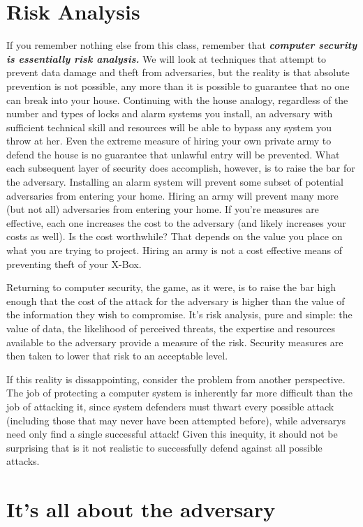\documentclass[11pt]{article}
\begin{document}
\section{Risk Analysis}
If you remember nothing else from this class, remember that \textit{\textbf{computer security is essentially
risk analysis.}}  We will look at techniques that attempt to prevent data damage and theft from adversaries, 
but the reality is that absolute prevention is not possible, any more than it is possible to guarantee that
no one can break into your house.  Continuing with the house analogy, regardless of the number and types of locks and alarm systems you install, 
an adversary with sufficient technical skill and resources will be able to bypass any system you throw at her.
Even the extreme measure of hiring your
own private army to defend the house is no guarantee that unlawful entry will be prevented.  What each subsequent layer of
security does accomplish, however, is to raise the bar for the adversary.  Installing an alarm system will prevent some subset of
potential adversaries from entering your home.  Hiring an army will prevent many more (but not all) adversaries from entering your home.  
If you're measures are effective, each one increases the cost to the adversary (and likely increases your
costs as well).  Is the cost worthwhile?  That depends on the value you place on what you are trying to project.  Hiring an army
is not a cost effective means of preventing theft of your X-Box.  

Returning to computer security, the game, as it were, is to raise the bar high enough that the cost of the attack for the adversary
is higher than the value of the information they wish to compromise.  It's risk analysis, pure and simple:  the value of data, the
likelihood of perceived threats, the expertise and resources available to the adversary provide a measure of the risk.  Security
measures are then taken to lower that risk to an acceptable level.

If this reality is dissappointing, consider the problem from another
perspective.  The job of protecting a computer system is inherently
far more difficult than the job of attacking it, since system
defenders must thwart every possible attack (including those that may
never have been attempted before), while adversarys need only find a
single successful attack!  Given this inequity, it should not be
surprising that is it not realistic to successfully defend against all
possible attacks.

\section{It's all about the adversary}
\end{document}
